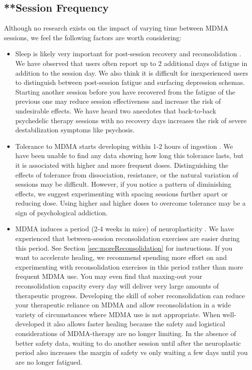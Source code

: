 \documentclass[12pt,letterpaper]{book}
\begin{document}
\subsection{**Session Frequency}
Although no research exists on the impact of varying time between MDMA sessions, we feel the following factors are worth considering:
\begin{itemize}
    \item Sleep is likely very important for post-session recovery and reconsolidation \cite{simon2020sleep}. We have observed that users often report up to 2 additional days of fatigue in addition to the session day. We also think it is difficult for inexperienced users to distinguish between post-session fatigue and surfacing depression schemas. Starting another session before you have recovered from the fatigue of the previous one may reduce session effectiveness and increase the risk of undesirable effects. We have heard two anecdotes that back-to-back psychedelic therapy sessions with no recovery days increases the risk of severe destabilization symptoms like psychosis.
    \item Tolerance to MDMA starts developing within 1-2 hours of ingestion \cite{farreTolerance,parrottTolerance}. We have been unable to find any data showing how long this tolerance lasts, but it is associated with higher and more frequent doses. Distinguishing the effects of tolerance from dissociation, resistance, or the natural variation of sessions may be difficult. However, if you notice a pattern of diminishing effects, we suggest experimenting with spacing sessions further apart or reducing dose. Using higher and higher doses to overcome tolerance may be a sign of psychological addiction.
    \item MDMA induces a period (2-4 weeks in mice) of neuroplasticity \cite{nardouMDMAPlasticity}. We have experienced that between-session reconsolidation exercises are easier during this period. See Section \ref{sec:moreReconsolidation} for instructions. If you want to accelerate healing, we recommend spending more effort on and experimenting with reconsolidation exercises in this period rather than more frequent MDMA use. You may even find that maxing-out your reconsolidation capacity every day will deliver very large amounts of therapeutic progress. Developing the skill of sober reconsolidation can reduce your therapeutic reliance on MDMA and allow reconsolidation in a wide variety of circumstances where MDMA use is not appropriate. When well-developed it also allows faster healing because the safety and logistical considerations of MDMA-therapy are no longer limiting. In the absence of better safety data, waiting to do another session until after the neuroplastic period also increases the margin of safety vs only waiting a few days until you are no longer fatigued.

\end{itemize}
\end{document}
